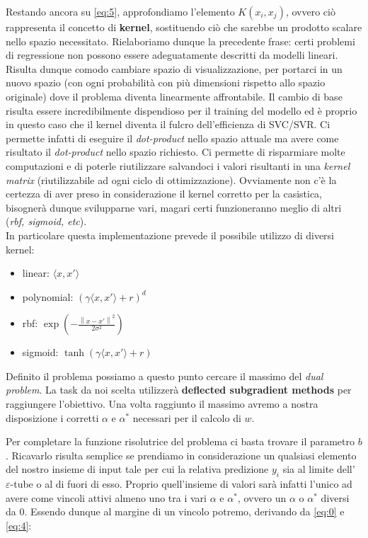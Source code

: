 \documentclass[12pt]{article}
\newcommand{\norm}[1]{\left\lVert#1\right\rVert}
\begin{document}

	Restando ancora su \eqref{eq:5}, approfondiamo l'elemento $K(x_i,x_j)$, ovvero ciò rappresenta il concetto di \textbf{kernel}, sostituendo ciò che sarebbe un prodotto scalare nello spazio necessitato. Rielaboriamo dunque la precedente frase: certi problemi di regressione non possono essere adeguatamente descritti da modelli lineari. Risulta dunque comodo cambiare spazio di visualizzazione, per portarci in un nuovo spazio (con ogni probabilità con più dimensioni rispetto allo spazio originale) dove il problema diventa linearmente affrontabile. Il cambio di base risulta essere incredibilmente dispendioso per il training del modello ed è proprio in questo caso che il kernel diventa il fulcro dell’efficienza di SVC/SVR. Ci permette infatti di eseguire il \textit{dot-product} nello spazio attuale ma avere come risultato il \textit{dot-product} nello spazio richiesto. Ci permette di risparmiare molte computazioni e di poterle riutilizzare salvandoci i valori risultanti in una \textit{kernel matrix} (riutilizzabile ad ogni ciclo di ottimizzazione). Ovviamente non c’è la certezza di aver preso in considerazione il kernel corretto per la casistica, bisognerà dunque svilupparne vari, magari certi funzioneranno meglio di altri (\textit{rbf, sigmoid, etc}).\\
In particolare questa implementazione prevede il possibile utilizzo di diversi kernel:
	\begin{itemize}
		\item linear: $\langle x,x' \rangle$
		\item polynomial: $(\gamma\langle x,x' \rangle + r)^d$
		\item rbf: $\exp(-\frac{\norm{x-x'}^2}{2\sigma^2})$
		\item sigmoid: $\tanh(\gamma\langle x,x' \rangle + r)$
	\end{itemize}

	Definito il problema possiamo a questo punto cercare il massimo del \textit{dual problem}. La task da noi scelta utilizzerà \textbf{deflected subgradient methods} per raggiungere l’obiettivo. Una volta raggiunto il massimo avremo a nostra disposizione i corretti $\alpha$ e $\alpha^*$ necessari per il calcolo di $w$. 

	Per completare la funzione risolutrice del problema ci basta trovare il parametro $b$. Ricavarlo risulta semplice se prendiamo in considerazione un qualsiasi elemento del nostro insieme di input tale per cui la relativa predizione $y_i$ sia al limite dell’ $\varepsilon$-tube o al di fuori di esso. Proprio quell’insieme di valori sarà infatti l’unico ad avere come vincoli attivi almeno uno tra i vari $\alpha$ e $\alpha^*$, ovvero un $\alpha$ o $\alpha^*$ diversi da 0. Essendo dunque al margine di un vincolo potremo, derivando da \eqref{eq:0} e \eqref{eq:4}:
\end{document}
